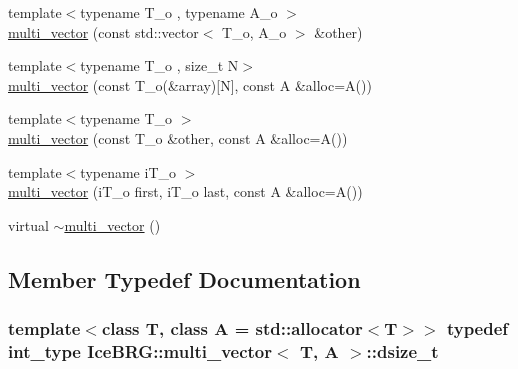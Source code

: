 \begin{DoxyCompactItemize}
\item 
{\footnotesize template$<$typename T\+\_\+o , typename A\+\_\+o $>$ }\\\hyperlink{classIceBRG_1_1multi__vector_ac300dd742268ef19405ce2ac8c9c3752}{multi\+\_\+vector} (const std\+::vector$<$ T\+\_\+o, A\+\_\+o $>$ \&other)
\item 
{\footnotesize template$<$typename T\+\_\+o , size\+\_\+t N$>$ }\\\hyperlink{classIceBRG_1_1multi__vector_a29f4de67e11d47b98b5ff2e81df0dc7f}{multi\+\_\+vector} (const T\+\_\+o(\&array)\mbox{[}N\mbox{]}, const A \&alloc=A())
\item 
{\footnotesize template$<$typename T\+\_\+o $>$ }\\\hyperlink{classIceBRG_1_1multi__vector_ac1d11f942532985324c8c3acb5801bec}{multi\+\_\+vector} (const T\+\_\+o \&other, const A \&alloc=A())
\item 
{\footnotesize template$<$typename i\+T\+\_\+o $>$ }\\\hyperlink{classIceBRG_1_1multi__vector_ad91e124b6658894a6e8162f85b1ddd8f}{multi\+\_\+vector} (i\+T\+\_\+o first, i\+T\+\_\+o last, const A \&alloc=A())
\item 
virtual \hyperlink{classIceBRG_1_1multi__vector_a5838dc2869a700c864ab13c2abd65277}{$\sim$multi\+\_\+vector} ()
\end{DoxyCompactItemize}


\subsection{Member Typedef Documentation}
\hypertarget{classIceBRG_1_1multi__vector_af2666369daa5e69abfbadbe365c200e9}{}
\subsubsection[{dsize\+\_\+t}]{\setlength{\rightskip}{0pt plus 5cm}template$<$class T, class A = std\+::allocator$<$\+T$>$$>$ typedef {\bf int\+\_\+type} {\bf Ice\+B\+R\+G\+::multi\+\_\+vector}$<$ T, A $>$\+::{\bf dsize\+\_\+t}}\label{classIceBRG_1_1multi__vector_af2666369daa5e69abfbadbe365c200e9}
\hypertarget{classIceBRG_1_1multi__vector_a468a7f934274e7aa75e01c94ac58f3ea}{}
